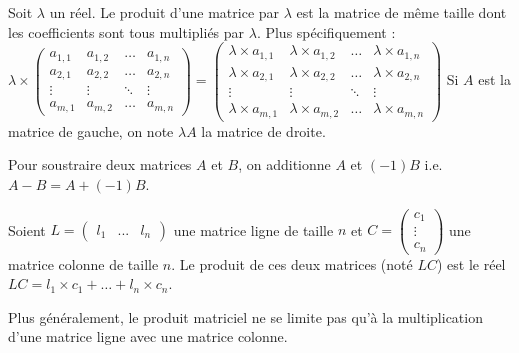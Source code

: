 	\begin{formula}
		Soit $\lambda$ un réel. Le produit d'une matrice par $\lambda$ est la matrice de même taille dont les coefficients sont tous multipliés par $\lambda$. Plus spécifiquement :
		\newpar
		$\displaystyle{\lambda \times \begin{pmatrix}a_{1,1} & a_{1,2} & \dots & a_{1,n} \\ a_{2,1} & a_{2,2} & \dots & a_{2,n} \\ \vdots & \vdots & \ddots & \vdots \\ a_{m,1} & a_{m,2} & \dots & a_{m,n}\end{pmatrix} = \begin{pmatrix}\lambda \times a_{1,1} & \lambda \times a_{1,2} & \dots & \lambda \times a_{1,n} \\ \lambda \times a_{2,1} & \lambda \times a_{2,2} & \dots & \lambda \times a_{2,n} \\ \vdots & \vdots & \ddots & \vdots \\ \lambda \times a_{m,1} & \lambda \times a_{m,2} & \dots & \lambda \times a_{m,n}\end{pmatrix}}$
		\newpar
		Si $A$ est la matrice de gauche, on note $\lambda A$ la matrice de droite.
	\end{formula}
	
	\begin{tip}
		Pour soustraire deux matrices $A$ et $B$, on additionne $A$ et $(-1)B$ i.e. $A - B = A + (-1)B$.
	\end{tip}
	
	\begin{formula}
		Soient $L = \begin{pmatrix}l_1 & ... & l_n\end{pmatrix}$ une matrice ligne de taille $n$ et $C = \begin{pmatrix}c_1 \\ \vdots \\ c_n\end{pmatrix}$ une matrice colonne de taille $n$.
		\newpar
		Le produit de ces deux matrices (noté $LC$) est le réel $LC = l_1 \times c_1 + \dots + l_n \times c_n$.
	\end{formula}
	
	Plus généralement, le produit matriciel ne se limite pas qu'à la multiplication d'une matrice ligne avec une matrice colonne.
	
